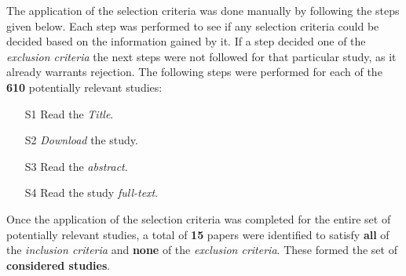 The application of the selection criteria was done manually by following the steps given below. 
Each step was performed to see if any selection criteria could be decided based on the information gained by it. 
If a step decided one of the \textit{exclusion criteria} the next steps were not followed for that particular study, 
as it already warrants rejection. 
The following steps were performed for each of the \textbf{610} potentially relevant studies:
\begin{itemize}
	\item[S1] Read the \textit{Title}.
	\item[S2] \textit{Download} the study.
	\item[S3] Read the \textit{abstract}.
	\item[S4] Read the study \textit{full-text}.
\end{itemize}

Once the application of the selection criteria was completed for the entire set of potentially relevant studies,
a total of \textbf{15} papers were identified to satisfy \textbf{all} of the \textit{inclusion criteria} and
\textbf{none} of the \textit{exclusion criteria}. These formed the set of \textbf{considered studies}.

\vspace{5mm}


